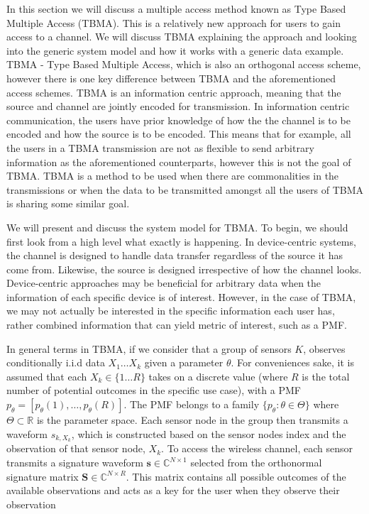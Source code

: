 \documentclass{article}
\begin{document}
In this section we will discuss a multiple access method known as Type Based Multiple Access (TBMA). This is a relatively new approach for users to gain access to a channel. We will discuss TBMA explaining the approach and looking into the generic system model and how it works with a generic data example. 
TBMA - Type Based Multiple Access, which is also an orthogonal access scheme, however there is one key difference between TBMA and the aforementioned access schemes. TBMA is an information centric approach, meaning that the source and channel are jointly encoded for transmission. In information centric communication, the users have prior knowledge of how the the channel is to be encoded and how the source is to be encoded. This means that for example, all the users in a TBMA transmission are not as flexible to send arbitrary information as the aforementioned counterparts, however this is not the goal of TBMA. TBMA is a method to be used when there are commonalities in the transmissions or when the data to be transmitted amongst all the users of TBMA is sharing some similar goal.

We will present and discuss the system model for TBMA. To begin, we should first look from a high level what exactly is happening. In device-centric systems, the channel is designed to handle data transfer regardless of the source it has come from. Likewise, the source is designed irrespective of how the channel looks. Device-centric approaches may be beneficial for arbitrary data when the information of each specific device is of interest. However, in the case of TBMA, we may not actually be interested in the specific information each user has, rather combined information that can yield metric of interest, such as a \ac{PMF}. 

In general terms in TBMA, if we consider that a group of sensors $K$, observes conditionally \ac{i.i.d} data $X_1 \dots X_k $ given a parameter $\theta$. For conveniences sake, it is assumed that each $X_k \in \{1 \dots R\}$ takes on a discrete value (where $R$ is the total number of potential outcomes in the specific use case), with a \ac{PMF}~${p_{\theta} = [p_{\theta}(1), \ldots, p_{\theta}(R)]}$. The \ac{PMF} belongs to a family $\{p_{\theta}: \theta \in \Theta\}$ where $\Theta \subset \mathbb{R}$ is the parameter space. Each sensor node in the group then transmits a waveform $s_{k,X_k}$, which is constructed based on the sensor nodes index and the observation of that sensor node, $X_k$. To access the wireless channel, each sensor transmits a signature waveform $\boldsymbol{s} \in \mathbb{C}^{N \times 1}$ selected from the orthonormal signature matrix $\boldsymbol{S} \in \mathbb{C}^{N \times R}$. This matrix contains all possible outcomes of the available observations and acts as a key for the user when they observe their observation
\end{document}
